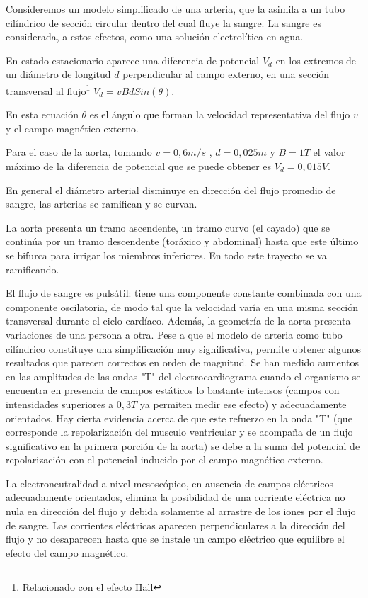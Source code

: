 Consideremos un modelo simplificado de una arteria, que la asimila a un tubo cilíndrico de sección circular dentro del cual fluye la sangre. La sangre es considerada, a estos efectos, como una solución electrolítica en agua.

En estado estacionario aparece una diferencia de potencial $V_{d}$ en los extremos de un diámetro de longitud $d$ perpendicular al campo externo, en una sección transversal al flujo\footnote{Relacionado con el efecto Hall} $V_{d}=v B d Sin(\theta)$.

En esta ecuación $\theta$ es el ángulo que forman la velocidad representativa del flujo $v$ y el campo magnético externo.

Para el caso de la aorta, tomando $v=0,6 m/s$ , $d=0,025 m$ y $B=1 T$ el valor máximo de la diferencia de potencial que se puede obtener es $V_{d}=0,015 V$.

En general el diámetro arterial disminuye en dirección del flujo promedio de sangre, las arterias se ramifican y se curvan.

La aorta presenta un tramo ascendente, un tramo curvo (el cayado) que se continúa por un tramo descendente (toráxico y abdominal) hasta que este último se bifurca para irrigar los miembros inferiores. En todo este trayecto se va ramificando.

El flujo de sangre es pulsátil: tiene una componente constante combinada con una componente oscilatoria, de modo tal que la velocidad varía en una misma sección transversal durante el ciclo cardíaco. Además, la geometría de la aorta presenta variaciones de una persona a otra.
Pese a que el modelo de arteria como tubo cilíndrico constituye una simplificación muy significativa, permite obtener algunos resultados que parecen correctos en orden de magnitud.
Se han medido aumentos en las amplitudes de las ondas "T" del electrocardiograma cuando el organismo se encuentra en presencia de campos estáticos lo bastante intensos (campos con intensidades superiores a $0,3 T$ ya permiten medir ese efecto) y adecuadamente orientados. Hay cierta evidencia acerca de que este refuerzo en la onda "T" (que corresponde la repolarización del musculo ventricular y se acompaña de un flujo significativo en la primera porción de la aorta) se debe a la suma del potencial de repolarización con el potencial inducido por el campo magnético externo.

La electroneutralidad a nivel mesoscópico, en ausencia de campos eléctricos adecuadamente orientados, elimina la posibilidad de una corriente eléctrica no nula en dirección del flujo y debida solamente al arrastre de los iones por el flujo de sangre.
Las corrientes eléctricas aparecen perpendiculares a la dirección del flujo y no desaparecen hasta que se instale un campo eléctrico que equilibre el efecto del campo magnético.

